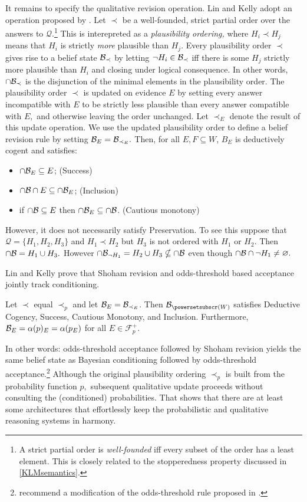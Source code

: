 It remains to specify the qualitative revision operation. Lin and Kelly adopt an
operation proposed by \citet{shoham1987semantical}. Let $\prec$ be a
well-founded, strict partial order over the answers to $\mathcal{Q}$.\footnote{A
strict partial order is {\em well-founded} iff every subset of the order has a
least element. This is closely related to the stopperedness property discussed
in \autoref{KLMsemantics}.} This is interepreted as a {\em plausibility
ordering,} where $H_i \prec H_j$ means that $H_i$ is strictly {\em more}
plausible than $H_j$. Every plausibility order $\prec$ gives rise to a belief
state $\mathcal{B}_\prec$ by letting $\neg H_i\in \mathcal{B}_\prec$ iff there is some $H_j$
strictly more plausible than $H_i$ and closing under logical consequence. In
other words, $\cap \mathcal{B}_\prec$ is the disjunction of the minimal elements in the
plausibility order. The plausibility order $\prec$ is updated on evidence $E$ by
setting every answer incompatible with $E$ to be strictly less plausible than
every answer compatible with $E,$ and otherwise leaving the order unchanged. Let
$\prec_E$ denote the result of this update operation. We use the updated
plausibility order to define a belief revision rule by setting $\mathcal{B}_E =
\mathcal{B}_{\prec_E}.$ Then, for all $E,F\subseteq W$, $B_E$ is deductively cogent and
satisfies:
\begin{itemize}
\item[] $\cap \mathcal{B}_E\subseteq E$; \hfill(Success)
\item[] $\cap \mathcal{B} \cap E \subseteq \cap\mathcal{B}_E$; \hfill(Inclusion)
\item[] if $\cap\mathcal{B}\subseteq E$ then $\cap \mathcal{B}_E \subseteq \cap \mathcal{B}$.
\hfill(Cautious monotony)
\end{itemize}
However, it does not necessarily satisfy Preservation. To see this suppose that
$\mathcal{Q}=\{H_1, H_2, H_3\}$ and $H_1 \prec H_2$ but $H_3$ is not ordered
with $H_1$ or $H_2$. Then $\cap \mathcal{B} = H_1\cup H_3.$ However $\cap\mathcal{B}_{\neg
H_1} = H_2 \cup H_3\nsubseteq \cap \mathcal{B}$ even though $\cap \mathcal{B} \cap \neg H_1
\neq \varnothing.$

Lin and Kelly prove that Shoham revision and odds-threshold based acceptance
jointly track conditioning.
\begin{theorem}
Let $\prec$  equal $\prec_p$ and let $\mathcal{B}_E = \mathcal{B}_{\prec_E}$. Then
$\Bel_{\powersetsubscr(W)}$ satisfies Deductive Cogency, Success, Cautious
Monotony, and Inclusion. Furthermore, $\mathcal{B}_E = \alpha(p)_E = \alpha(p_E)$ for
all $E\in\mathcal{F}_p^+$.
\end{theorem}
In other words: odds-threshold acceptance followed by Shoham revision yields the
same belief state as Bayesian conditioning followed by odds-threshold
acceptance.\footnote{\citet{lin2019correspondence} recommend a modification of
the odds-threshold rule proposed in  \citet{lin2012propositional}. }  Although
the original plausibility ordering $\prec_p$ is built from the probability
function $p,$ subsequent qualitative update proceeds without consulting the
(conditioned) probabilities. That shows that there are at least some
architectures that effortlessly keep the probabilistic and qualitative reasoning
systems in harmony.

